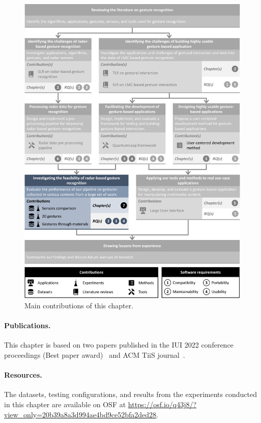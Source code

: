 \begin{figure}
    \centering
    \includegraphics[width=\linewidth]{Figures/RadarExperiments/graphical-summary-radar-experiments.pdf}
    \vspace{-18pt}
    \caption{Main contributions of this chapter.}
    \label{fig:radar-experiments:graphical-summary}
  \end{figure}

\paragraph{Publications.} This chapter is based on two papers published in the IUI 2022 conference proceedings (Best paper award)~\cite{Sluyters:2022:IUI} and ACM TiiS journal~\cite{Sluyters:2023}.

\paragraph{Resources.} The datasets, testing configurations, and results from the experiments conducted in this chapter are available on OSF at \url{https://osf.io/q43j8/?view_only=20b39a8a3d994ae4bd9ce52bfa2ded28}.



